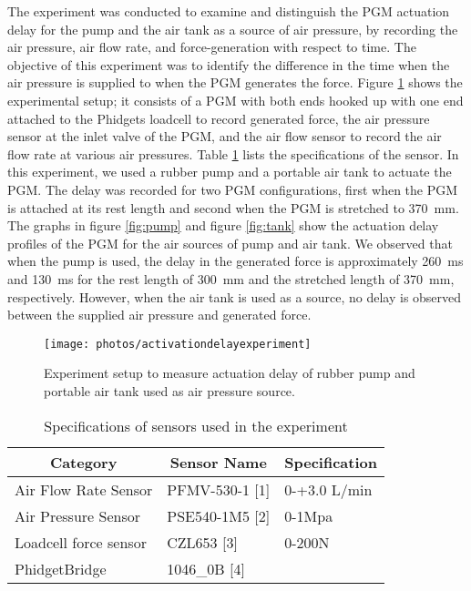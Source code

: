 \documentclass[paper,JRM,paper]{jaciiiarticle}
\begin{document}
The experiment was conducted to examine and distinguish the PGM actuation delay for the pump and the air tank as a source of air pressure, by recording the air pressure, air flow rate, and force-generation with respect to time. The objective of this experiment was to identify the difference in the time when the air pressure is supplied to when the PGM generates the force. Figure \ref{fig:activationdelayexperiment} shows the experimental setup; it consists of a PGM with both ends hooked up with one end attached to the Phidgets loadcell to record generated force, the air pressure sensor at the inlet valve of the PGM, and the air flow sensor to record the air flow rate at various air pressures. Table \ref{sensordetails} lists the specifications of the sensor. In this experiment, we used a rubber pump and a portable air tank to actuate the PGM. The delay was recorded for two PGM configurations, first when the PGM is attached at its rest length and second when the PGM is stretched to  \SI{370}{\milli\meter}. The graphs in figure \ref{fig:pump} and figure \ref{fig:tank} show the actuation delay profiles of the PGM for the air sources of pump and air tank. We observed that when the pump is used, the delay in the generated force is approximately \SI{260}{\milli\second} and \SI{130}{\milli\second} for the rest length of \SI{300}{\milli\meter} and the stretched length of \SI{370}{\milli\meter}, respectively. However, when the air tank is used as a source, no delay is observed between the supplied air pressure and generated force.

\begin{figure}
	\centering
	\texttt{[image: photos/activationdelayexperiment]}
	\caption{Experiment setup to measure actuation delay of rubber pump and portable air tank used as air pressure source.}
	\label{fig:activationdelayexperiment}
\end{figure}

\begin{table}[]
	\begin{tabular}{@{}lll@{}}
		\toprule
		\multicolumn{1}{c}{Category} & \multicolumn{1}{c}{Sensor Name} & \multicolumn{1}{c}{Specification} \\ \midrule
		Air Flow Rate Sensor & PFMV-530-1 {[}1{]} & 0-+3.0 L/min \\
		Air Pressure Sensor & PSE540-1M5 {[}2{]} & 0-1Mpa \\
		Loadcell force sensor & CZL653  {[}3{]} & 0-200N \\
		PhidgetBridge & 1046\_0B {[}4{]} &  \\ \bottomrule
	\end{tabular}
	\caption{Specifications of sensors used in the experiment}
	\label{sensordetails}
\end{table}
\end{document}
